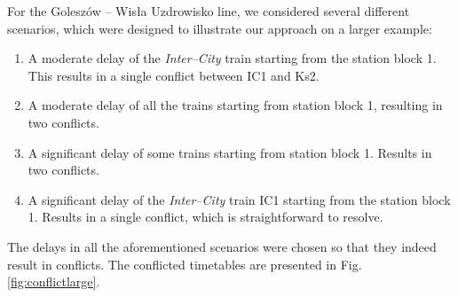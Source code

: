 For the Goleszów -- Wisła Uzdrowisko line, we considered several different
scenarios, which were designed to illustrate our approach on a larger example:

\begin{enumerate}
  \item A moderate delay of the \emph{Inter--City} train starting from the station
    block 1. This results in a single conflict between IC1 and Ks2.
  \item A moderate delay of all the trains starting from station block 1, resulting in
    two conflicts.
  \item A significant delay of some trains starting from station block 1. Results in
    two conflicts.
  \item A significant delay of the \emph{Inter--City} train IC1 starting from the
    station block 1. Results in a single conflict, which is straightforward to
    resolve.
\end{enumerate}

The delays in all the aforementioned scenarios were chosen so that they indeed
result in conflicts. The conflicted timetables are presented in Fig.
\ref{fig:conflictlarge}.

